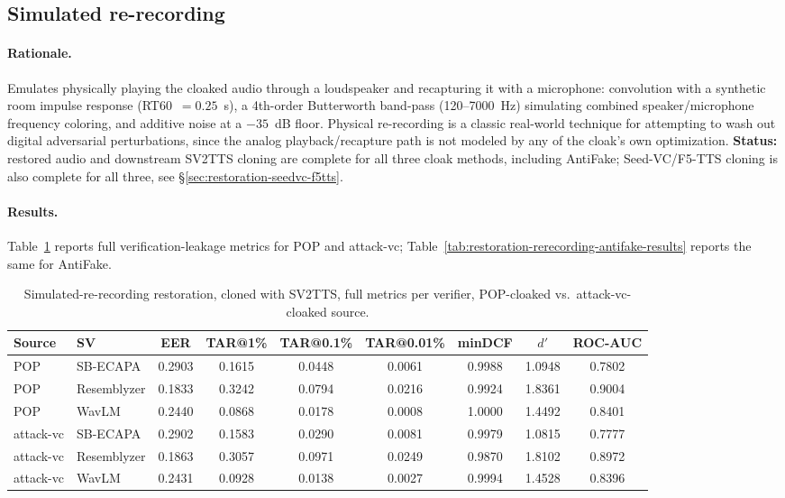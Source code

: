 \documentclass[11pt]{article}
\begin{document}
\subsection{Simulated re-recording}
\label{sec:restoration-rerecording}

\paragraph{Rationale.} Emulates physically playing the cloaked audio
through a loudspeaker and recapturing it with a microphone: convolution
with a synthetic room impulse response (RT60~$=0.25$~s), a 4th-order
Butterworth band-pass (120--7000~Hz) simulating combined
speaker/microphone frequency coloring, and additive noise at a $-35$~dB
floor. Physical re-recording is a classic real-world technique for
attempting to wash out digital adversarial perturbations, since the
analog playback/recapture path is not modeled by any of the cloak's
own optimization. \textbf{Status:} restored audio and downstream SV2TTS
cloning are complete for all three cloak methods, including AntiFake;
Seed-VC/F5-TTS cloning is also complete for all three, see
\S\ref{sec:restoration-seedvc-f5tts}.

\paragraph{Results.} Table~\ref{tab:restoration-rerecording-results}
reports full verification-leakage metrics for POP and attack-vc;
Table~\ref{tab:restoration-rerecording-antifake-results} reports the
same for AntiFake.

\begin{table}[H]
\centering
\caption{Simulated-re-recording restoration, cloned with SV2TTS, full
metrics per verifier, POP-cloaked vs.\ attack-vc-cloaked source.}
\label{tab:restoration-rerecording-results}
\begin{tabular}{llccccccc}
\toprule
Source & SV & EER & TAR@1\% & TAR@0.1\% & TAR@0.01\% & minDCF & $d'$ & ROC-AUC \\
\midrule
POP        & SB-ECAPA    & 0.2903 & 0.1615 & 0.0448 & 0.0061 & 0.9988 & 1.0948 & 0.7802 \\
POP        & Resemblyzer & 0.1833 & 0.3242 & 0.0794 & 0.0216 & 0.9924 & 1.8361 & 0.9004 \\
POP        & WavLM       & 0.2440 & 0.0868 & 0.0178 & 0.0008 & 1.0000 & 1.4492 & 0.8401 \\
\addlinespace
attack-vc  & SB-ECAPA    & 0.2902 & 0.1583 & 0.0290 & 0.0081 & 0.9979 & 1.0815 & 0.7777 \\
attack-vc  & Resemblyzer & 0.1863 & 0.3057 & 0.0971 & 0.0249 & 0.9870 & 1.8102 & 0.8972 \\
attack-vc  & WavLM       & 0.2431 & 0.0928 & 0.0138 & 0.0027 & 0.9994 & 1.4528 & 0.8396 \\
\bottomrule
\end{tabular}
\end{table}
\end{document}
